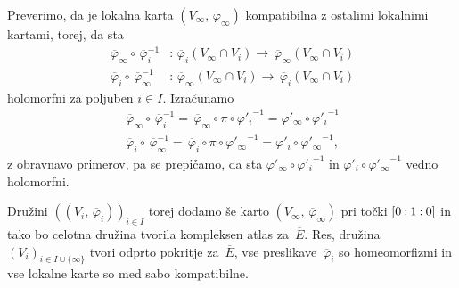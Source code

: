 \documentclass[mat1]{fmfdelo}
\newcommand{\inv}{^{-1}}
\newcommand{\pcoor}[1]{%
  \begingroup\lccode`~=`: \lowercase{\endgroup
  \edef~}{\mathbin{\mathchar\the\mathcode`:}\nobreak}%
  [%
  \begingroup
  \mathcode`:=\string"8000
  #1%
  \endgroup
  ]%
}
\newcommand{\olsi}[1]{\,\overline{\!{#1}}} %
\DeclareMathOperator{\id}{id}
\theoremstyle{definition}
\begin{document}
Preverimo, da je lokalna karta $(V_\infty, \olsi{\varphi}_\infty)$ kompatibilna z ostalimi lokalnimi kartami, torej, da sta
\begin{align*}
    \olsi{\varphi}_\infty \circ \olsi{\varphi}_i\inv &: \olsi{\varphi}_i(V_\infty \cap V_i) \to \olsi{\varphi}_\infty(V_\infty \cap V_i) \\
    \olsi{\varphi}_i \circ \olsi{\varphi}_\infty\inv &: \olsi{\varphi}_\infty(V_\infty \cap V_i) \to \olsi{\varphi}_i(V_\infty \cap V_i) 
\end{align*}
holomorfni za poljuben $i \in I$. Izračunamo
\begin{align*}
    \olsi{\varphi}_\infty \circ \olsi{\varphi}_i\inv = 
    \olsi{\varphi}_\infty \circ \pi \circ {\varphi'_i}\inv =
    \varphi'_\infty \circ {\varphi'_i}\inv \\
    \olsi{\varphi}_i \circ \olsi{\varphi}_\infty\inv = 
    \olsi{\varphi}_i \circ \pi \circ {\varphi'_\infty}\inv = 
    \varphi'_i \circ {\varphi'_\infty}\inv,
\end{align*}
z obravnavo primerov, pa se prepičamo, da sta $\varphi'_\infty \circ {\varphi'_i}\inv$ in $\varphi'_i \circ {\varphi'_\infty}\inv$ vedno holomorfni.

Družini $((V_i, \olsi{\varphi}_i))_{i \in I}$ torej dodamo še karto $(V_\infty, \olsi{\varphi}_\infty)$ pri točki $\pcoor{0 : 1 : 0}$ in tako bo celotna družina tvorila kompleksen atlas za $\olsi{E}$. Res, družina $(V_i)_{i \in I \cup \{\infty\}}$ tvori odprto pokritje za $\olsi{E}$, vse preslikave $\olsi{\varphi}_i$ so homeomorfizmi in vse lokalne karte so med sabo kompatibilne. 





\end{document}
